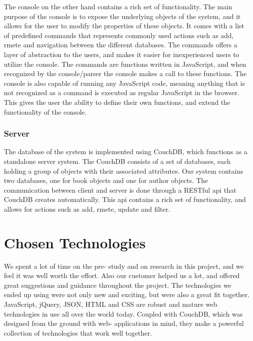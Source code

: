 The console on the other hand contains a rich set of functionality. The main purpose of the console is to expose the underlying objects of the system, and it allows for the user to modify the properties of these objects. It comes with a list of predefined commands that represents commonly used actions such as add, rmete and navigation between the different databases. The commands offers a layer of abstraction to the users, and makes it easier for inexperienced users to utilize the console. The commands are functions written in JavaScript, and when recognized by the console/parser the console makes a call to these functions. The console is also capable of running any JavaScript code, meaning anything that is not recognized as a command is executed as regular JavaScript in the browser. This gives the user the ability to define their own functions, and extend the functionality of the console.

\subsubsection{Server}
The database of the system is implemented using CouchDB, which functions as a standalone server system. The CouchDB consists of a set of databases, each holding a group of objects with their associated attributes. Our system contains two databases, one for book objects and one for author objects. The communication between client and server is done through a RESTful api that CouchDB creates automatically. This api contains a rich set of functionality, and allows for actions such as add, rmete, update and filter.

\section{Chosen Technologies}
We spent a lot of time on the pre- study and on research in this project, and we feel it was well worth the effort. Also our customer helped us a lot, and offered great suggestions and guidance throughout the project. The technologies we ended up using were not only new and exciting, but were also a great fit together. JavaScript, jQuery, JSON, HTML and CSS are robust and mature web technologies in use all over the world today. Coupled with CouchDB, which was designed from the ground with web- applications in mind, they make a powerful collection of technologies that work well together.

